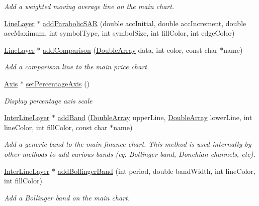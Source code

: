 \begin{DoxyCompactItemize}
\begin{DoxyCompactList}\small\item\em Add a weighted moving average line on the main chart. \end{DoxyCompactList}\item 
\hyperlink{class_line_layer}{Line\+Layer} $\ast$ \hyperlink{class_finance_chart_a1f8317ff1ee6936114a408c7139e64d1}{add\+Parabolic\+S\+AR} (double acc\+Initial, double acc\+Increment, double acc\+Maximum, int symbol\+Type, int symbol\+Size, int fill\+Color, int edge\+Color)
\item 
\hyperlink{class_line_layer}{Line\+Layer} $\ast$ \hyperlink{class_finance_chart_a70070d425a15afa754f1d76e1d5f9dfc}{add\+Comparison} (\hyperlink{class_double_array}{Double\+Array} data, int color, const char $\ast$name)
\begin{DoxyCompactList}\small\item\em Add a comparison line to the main price chart. \end{DoxyCompactList}\item 
\hyperlink{class_axis}{Axis} $\ast$ \hyperlink{class_finance_chart_aae20ef522feef3ab61e8b8639c15275e}{set\+Percentage\+Axis} ()
\begin{DoxyCompactList}\small\item\em Display percentage axis scale \end{DoxyCompactList}\item 
\hyperlink{class_inter_line_layer}{Inter\+Line\+Layer} $\ast$ \hyperlink{class_finance_chart_a821e548e8833d123ba447479959fbe7a}{add\+Band} (\hyperlink{class_double_array}{Double\+Array} upper\+Line, \hyperlink{class_double_array}{Double\+Array} lower\+Line, int line\+Color, int fill\+Color, const char $\ast$name)
\begin{DoxyCompactList}\small\item\em Add a generic band to the main finance chart. This method is used internally by other methods to add various bands (eg. Bollinger band, Donchian channels, etc). \end{DoxyCompactList}\item 
\hyperlink{class_inter_line_layer}{Inter\+Line\+Layer} $\ast$ \hyperlink{class_finance_chart_aa1698c472254b430e501324024725cfb}{add\+Bollinger\+Band} (int period, double band\+Width, int line\+Color, int fill\+Color)
\begin{DoxyCompactList}\small\item\em Add a Bollinger band on the main chart. \end{DoxyCompactList}\item 

\end{DoxyCompactItemize}
